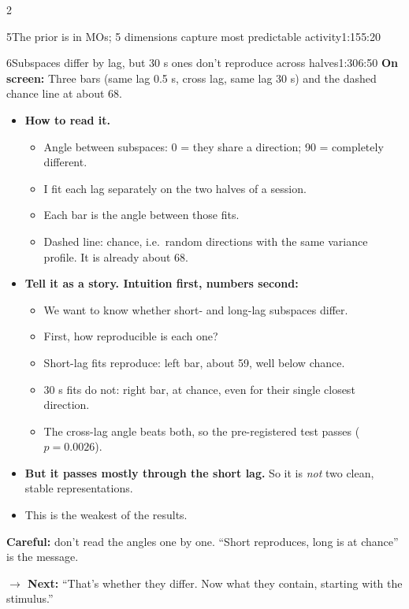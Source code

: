 \documentclass[10pt]{article}
\newcommand{\point}[1]{{\color{ink}\textbf{On screen:} #1}\par}
\newcommand{\avoid}[1]{\par{\color{warn}\textbf{Careful:} #1}\par}
\newcommand{\bridge}[1]{\par{\color{accent}\textbf{$\rightarrow$ Next:} #1}\par}
\begin{document}
\begin{multicols}{2}
\begin{slidebox}{5}{The prior is in MOs; 5 dimensions capture most predictable activity}{1:15}{5:20}
\end{slidebox}
\begin{slidebox}{6}{Subspaces differ by lag, but 30 s ones don't reproduce across halves}{1:30}{6:50}
\point{Three bars (same lag 0.5 s, cross lag, same lag 30 s) and the dashed chance line at about 68\textdegree.}
\begin{itemize}
\item \textbf{How to read it.}
  \begin{itemize}
  \item Angle between subspaces: 0\textdegree{} = they share a direction; 90\textdegree{} = completely different.
  \item I fit each lag separately on the two halves of a session.
  \item Each bar is the angle between those fits.
  \item Dashed line: chance, i.e.\ random directions with the same variance profile. It is already about
  68\textdegree.
  \end{itemize}
\item \textbf{Tell it as a story. Intuition first, numbers second:}
  \begin{itemize}
  \item We want to know whether short- and long-lag subspaces differ.
  \item First, how reproducible is each one?
  \item Short-lag fits reproduce: left bar, about 59\textdegree, well below chance.
  \item 30 s fits do not: right bar, at chance, even for their single closest direction.
  \item The cross-lag angle beats both, so the pre-registered test passes ($p = 0.0026$).
  \end{itemize}
\item \textbf{But it passes mostly through the short lag.} So it is \emph{not} two clean, stable representations.
\item This is the weakest of the results.
\end{itemize}
\avoid{don't read the angles one by one. ``Short reproduces, long is at chance'' is the message.}
\bridge{``That's whether they differ. Now what they contain, starting with the stimulus.''}


\end{slidebox}
\end{multicols}
\end{document}
